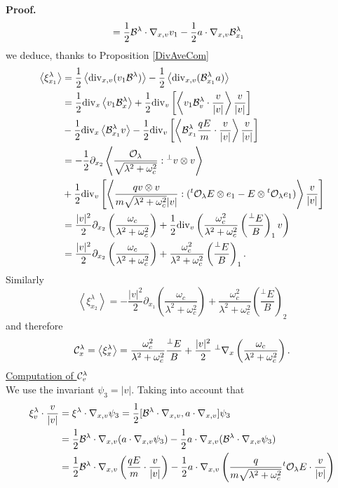 \documentclass[12pt, a4paper]{article}
\newcounter{steps}
\newenvironment{proof}[1][]{%
\par\medbreak\setcounter{steps}{0}
{\noindent\bfseries Proof#1. }} {\hfill\fbox{\ }\medbreak}
\newcommand{\xil}[0]{
\xi^\lambda}
\newcommand{\bl}[0]{
{\cal B}^\lambda}
\newcommand{\cl}[0]{
{\cal C} ^\lambda}
\newcommand{\ol}[0]{
{\cal O}_\lambda}
\newcommand{\radlo}[0]{
\sqrt{\lambda ^2 + \omega _c ^2}}
\newcommand{\Divx}[0]{
\mathrm{div}_x}
\newcommand{\Divv}[0]{
\mathrm{div}_v}
\newcommand{\Divxv}[0]{
\mathrm{div}_{x,v}}
\newcommand{\nxv}[0]{
\nabla_{x,v}}
\newcommand{\ave}[1]{
\left \langle #1 \right \rangle }
\begin{document}
\begin{proof}
\begin{align*}
& = \frac{1}{2} \bl \cdot \nxv v_1 - \frac{1}{2} a \cdot \nxv \bl _{x_1}
\end{align*}
we deduce, thanks to Proposition \ref{DivAveCom}
\begin{align*}
\ave{\xil _{x_1}} & = \frac{1}{2}\ave{\Divxv( v_1 \bl)} - \frac{1}{2} \ave{\Divxv(\bl _{x_1} a)} \\
& = \frac{1}{2}\Divx \ave{v_1 \bl _x } + \frac{1}{2}\Divv \left [ \ave{v_1 \bl _v \cdot \frac{v}{|v|}}\frac{v}{|v|}  \right ]\\
& - \frac{1}{2}\Divx \ave{\bl _{x_1} v } - \frac{1}{2}\Divv \left [ \ave{\bl _{x_1} \frac{qE}{m}\cdot \frac{v}{|v|}}\frac{v}{|v|}  \right ]\\
& = - \frac{1}{2} \partial _{x_2} \ave{\frac{\ol}{\radlo}: {^\perp v} \otimes v}\\ 
& + \frac{1}{2} \Divv \left [\ave{\frac{q v \otimes v}{m \radlo |v|} : ( {^t \ol} E \otimes e_1 - E \otimes {^t \ol} e_1 ) } \frac{v}{|v|}    \right]\\
& = \frac{|v|^2}{2} \partial _{x_2} \left (   \frac{\omega _c}{\lambda ^2 + \omega _c ^2} \right ) + \frac{1}{2}\Divv \left (\frac{\omega _c ^2 }{\lambda ^2 + \omega _c ^2} \left ( \frac{^\perp E}{B} \right )_1 v   \right )\\
& = \frac{|v|^2}{2} \partial _{x_2} \left (   \frac{\omega _c}{\lambda ^2 + \omega _c ^2}\right ) 
+\frac{\omega _c ^2 }{\lambda ^2 + \omega _c ^2}\left ( \frac{^\perp E}{B} \right )_1.
\end{align*}
Similarly 
\[
\ave{\xil _{x_2}} = -\frac{|v|^2}{2} \partial _{x_1} \left (   \frac{\omega _c}{\lambda ^2 + \omega _c ^2}\right ) 
+\frac{\omega _c ^2 }{\lambda ^2 + \omega _c ^2}\left ( \frac{^\perp E}{B} \right )_2
\]
and therefore 
\[
\cl _x = \ave{\xil _x} = \frac{\omega _c ^2}{\lambda ^2 + \omega _c ^2}\frac{^\perp E}{B} + \frac{|v|^2}{2} \;{^\perp \nabla _x } \left ( \frac{\omega _c}{\lambda ^2 + \omega _c ^2}\right ).
\]
\underline{Computation of $\cl _v$}\\
We use the invariant $\psi _3 = |v|$. Taking into account that 
\begin{align*}
\xil _v \cdot \frac{v}{|v|} & = \xil \cdot \nxv \psi _3 = \frac{1}{2} [\bl \cdot \nxv, a \cdot \nxv ] \psi _3\\
& = \frac{1}{2} \bl \cdot \nxv ( a \cdot \nxv \psi _3) - \frac{1}{2} a \cdot \nxv ( \bl \cdot \nxv \psi _3) \\
& = \frac{1}{2} \bl \cdot \nxv \left ( \frac{qE}{m} \cdot \frac{v}{|v|} \right ) - \frac{1}{2} a \cdot \nxv \left ( \frac{q }{m \radlo} {^t \ol }E \cdot \frac{v}{|v|} \right )

\end{align*}
\end{proof}
\end{document}
